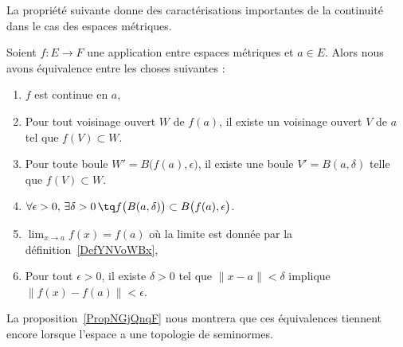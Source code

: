La propriété suivante donne des caractérisations importantes de la continuité dans le cas des espaces métriques.
\begin{proposition} \label{PropQZRNpMn}
    Soient \( f\colon E\to F\) une application entre espaces métriques et \( a\in E\). Alors nous avons équivalence entre les choses suivantes :
    \begin{enumerate}
        \item\label{ItemCBUoRWJi}
            \( f\) est continue en \( a\),
        \item\label{ItemCBUoRWJii}
            Pour tout voisinage ouvert \( W\) de \( f(a)\), il existe un voisinage ouvert \( V\) de \( a\) tel que \( f(V)\subset W\).
        \item\label{ItemCBUoRWJiii}
            Pour toute boule \( W'=B\big( f(a),\epsilon \big)\), il existe une boule \( V'=B(a,\delta)\) telle que \( f(V)\subset W\).
        \item\label{ItemCBUoRWJiv}
            $\forall \epsilon>0,\,\exists \delta>0\,\tq f\big( B(a,\delta) \big)\subset B\big( f(a),\epsilon \big)$.
        \item\label{ItemYNQpikrii}
            \( \lim_{x\to a}f(x)=f(a)\) où la limite est donnée par la définition~\ref{DefYNVoWBx},
        \item\label{ItemYNQpikriii}
            Pour tout \( \epsilon>0\), il existe \( \delta>0\) tel que \( \| x-a \|<\delta\) implique \( \| f(x)-f(a) \|<\epsilon\).
    \end{enumerate}
\end{proposition}
La proposition~\ref{PropNGjQnqF} nous montrera que ces équivalences tiennent encore lorsque l'espace a une topologie de seminormes.

